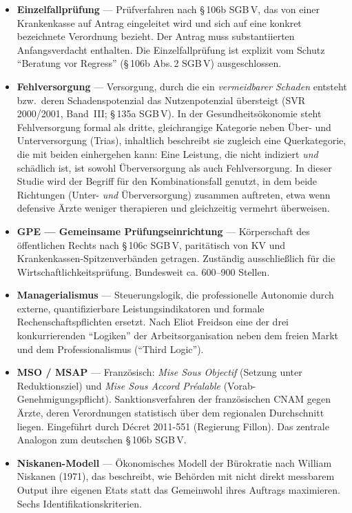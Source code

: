 \documentclass{umbruch-position}
\begin{document}
\begin{sloppypar}
\begin{itemize}[leftmargin=1em, itemsep=0.6em]
  \item \textbf{Einzelfallprüfung} --- Prüfverfahren nach \S\,106b SGB\,V, das von einer Krankenkasse auf Antrag eingeleitet wird und sich auf eine konkret bezeichnete Verordnung bezieht. Der Antrag muss substantiierten Anfangsverdacht enthalten. Die Einzelfallprüfung ist explizit vom Schutz ``Beratung vor Regress'' (\S\,106b Abs.\,2 SGB\,V) ausgeschlossen.
  \item \textbf{Fehlversorgung} --- Versorgung, durch die ein \textit{vermeidbarer Schaden} entsteht bzw.\ deren Schadenspotenzial das Nutzenpotenzial übersteigt (SVR 2000/2001, Band~III; \S\,135a SGB\,V). In der Gesundheitsökonomie steht Fehlversorgung formal als dritte, gleichrangige Kategorie neben Über- und Unterversorgung (Trias), inhaltlich beschreibt sie zugleich eine Querkategorie, die mit beiden einhergehen kann: Eine Leistung, die nicht indiziert \textit{und} schädlich ist, ist sowohl Überversorgung als auch Fehlversorgung. In dieser Studie wird der Begriff für den Kombinationsfall genutzt, in dem beide Richtungen (Unter- \textit{und} Überversorgung) zusammen auftreten, etwa wenn defensive Ärzte weniger therapieren und gleichzeitig vermehrt überweisen.
  \item \textbf{GPE --- Gemeinsame Prüfungseinrichtung} --- Körperschaft des öffentlichen Rechts nach \S\,106c SGB\,V, paritätisch von KV und Krankenkassen-Spitzenverbänden getragen. Zuständig ausschließlich für die Wirtschaftlichkeitsprüfung. Bundesweit ca. 600--900 Stellen.
  \item \textbf{Managerialismus} --- Steuerungslogik, die professionelle Autonomie durch externe, quantifizierbare Leistungsindikatoren und formale Rechenschaftspflichten ersetzt. Nach Eliot Freidson eine der drei konkurrierenden ``Logiken'' der Arbeitsorganisation neben dem freien Markt und dem Professionalismus (``Third Logic'').
  \item \textbf{MSO / MSAP} --- Französisch: \textit{Mise Sous Objectif} (Setzung unter Reduktionsziel) und \textit{Mise Sous Accord Pr\'ealable} (Vorab-Genehmigungspflicht). Sanktionsverfahren der französischen CNAM gegen Ärzte, deren Verordnungen statistisch über dem regionalen Durchschnitt liegen. Eingeführt durch D\'ecret 2011-551 (Regierung Fillon). Das zentrale Analogon zum deutschen \S\,106b SGB\,V.
  \item \textbf{Niskanen-Modell} --- Ökonomisches Modell der Bürokratie nach William Niskanen (1971), das beschreibt, wie Behörden mit nicht direkt messbarem Output ihre eigenen Etats statt das Gemeinwohl ihres Auftrags maximieren. Sechs Identifikationskriterien.

\end{itemize}
\end{sloppypar}
\end{document}
